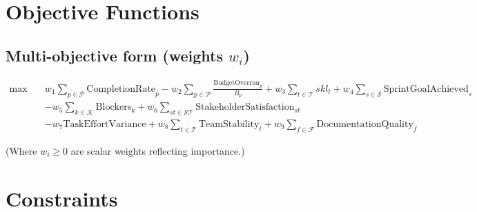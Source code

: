 \documentclass{article}
\begin{document}
\section*{Objective Functions}

\subsection*{Multi-objective form (weights $w_i$)}

\begin{align*}
    \max \quad & w_1 \sum_{p \in \mathcal{P}} \text{CompletionRate}_p 
    - w_2 \sum_{p \in \mathcal{P}} \frac{\text{BudgetOverrun}_p}{B_p}
    + w_3 \sum_{t \in \mathcal{T}} skl_t 
    + w_4 \sum_{s \in \mathcal{S}} \text{SprintGoalAchieved}_s \\
    & - w_5 \sum_{k \in \mathcal{K}} \text{Blockers}_k
    + w_6 \sum_{st \in \mathcal{ST}} \text{StakeholderSatisfaction}_{st} \\
    & - w_7 \text{TaskEffortVariance} 
    + w_8 \sum_{t \in \mathcal{T}} \text{TeamStability}_t
    + w_9 \sum_{f \in \mathcal{F}} \text{DocumentationQuality}_f
\end{align*}

(Where $w_i \geq 0$ are scalar weights reflecting importance.)

\section*{Constraints}
\end{document}
